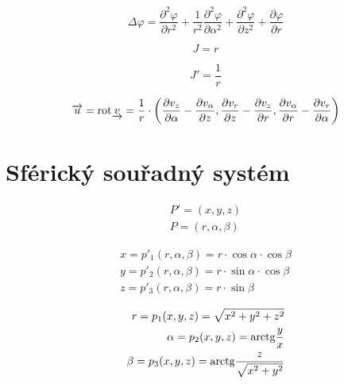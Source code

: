 \begin{equation}
\label{eq:cylindricky_ss_laplace}
\Delta \varphi = \frac{\partial^2 \varphi}{\partial r^2} + \frac{1}{r^2} \frac{\partial^2 \varphi}{\partial \alpha^2} + \frac{\partial^2 \varphi}{\partial z^2} + \frac{\partial \varphi}{\partial r}
\end{equation}

\begin{equation}
\label{eq:cylindricky_ss_j}
J = r
\end{equation}

\begin{equation}
\label{eq:cylindricky_ss_j_inv}
J' = \frac{1}{r}
\end{equation}

\begin{equation}
\label{eq:cylindricky_ss_rotace}
\overrightarrow{u} = \mathrm{rot} \underrightarrow{v} = \frac{1}{r} \cdot \left( \frac{\partial v_{z}}{\partial \alpha} - \frac{\partial v_{\alpha}}{\partial z}, \frac{\partial v_{r}}{\partial z} - \frac{\partial v_{z}}{\partial r}, \frac{\partial v_{\alpha}}{\partial r} - \frac{\partial v_{r}}{\partial \alpha} \right)
\end{equation}


\section{Sférický souřadný systém}

\begin{equation}
\begin{split}
P' = (x, y, z) \\
P = (r, \alpha, \beta)
\end{split}
\end{equation}

\begin{equation}
\begin{split}
x = p'_1(r, \alpha, \beta) = r \cdot \cos \alpha \cdot \cos \beta \\
y = p'_2(r, \alpha, \beta) = r \cdot \sin \alpha \cdot \cos \beta \\
z = p'_3(r, \alpha, \beta) = r \cdot \sin \beta
\end{split}
\end{equation}

\begin{equation}
\begin{split}
r = p_1(x, y, z) = \sqrt{x^2 + y^2 + z^2} \\
\alpha = p_2(x, y, z) = \mathrm{arctg} \frac{y}{x} \\
\beta = p_3(x, y, z) = \mathrm{arctg} \frac{z}{\sqrt{x^2 + y^2}}
\end{split}
\end{equation}

